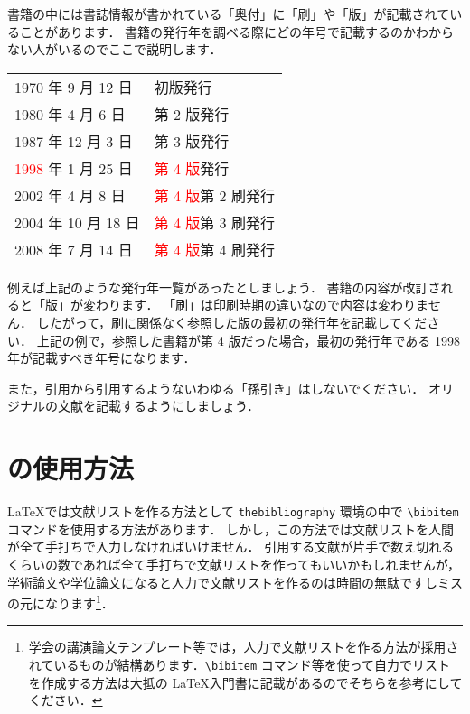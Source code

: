 書籍の中には書誌情報が書かれている「奥付」に「刷」や「版」が記載されていることがあります．
書籍の発行年を調べる際にどの年号で記載するのかわからない人がいるのでここで説明します．
\begin{center}
    \begin{tabular}{ll}
        1970 年 9 月 12 日  & 初版発行 \\
        1980 年 4 月 6 日   & 第 2 版発行 \\
        1987 年 12 月 3 日  & 第 3 版発行 \\
        \textcolor{red}{1998} 年 1 月 25 日  & \textcolor{red}{第 4 版}発行 \\
        2002 年 4 月 8 日   & \textcolor{red}{第 4 版}第 2 刷発行 \\
        2004 年 10 月 18 日 & \textcolor{red}{第 4 版}第 3 刷発行 \\
        2008 年 7 月 14 日  & \textcolor{red}{第 4 版}第 4 刷発行
    \end{tabular}
\end{center}
例えば上記のような発行年一覧があったとしましょう．
書籍の内容が改訂されると「版」が変わります．
「刷」は印刷時期の違いなので内容は変わりません．
したがって，刷に関係なく参照した版の最初の発行年を記載してください．
上記の例で，参照した書籍が第 4 版だった場合，最初の発行年である 1998 年が記載すべき年号になります．

また，引用から引用するようないわゆる「孫引き」はしないでください．
オリジナルの文献を記載するようにしましょう．


\section{\BibTeX の使用方法}
\label{sec:howtouse_bibtex}

\LaTeX では文献リストを作る方法として \verb|thebibliography| 環境の中で \verb|\bibitem| コマンドを使用する方法があります．
しかし，この方法では文献リストを人間が全て手打ちで入力しなければいけません．
引用する文献が片手で数え切れるくらいの数であれば全て手打ちで文献リストを作ってもいいかもしれませんが，学術論文や学位論文になると人力で文献リストを作るのは時間の無駄ですしミスの元になります\footnote{学会の講演論文テンプレート等では，人力で文献リストを作る方法が採用されているものが結構あります．\texttt{\textbackslash bibitem} コマンド等を使って自力でリストを作成する方法は大抵の \LaTeX 入門書に記載があるのでそちらを参考にしてください．}．

